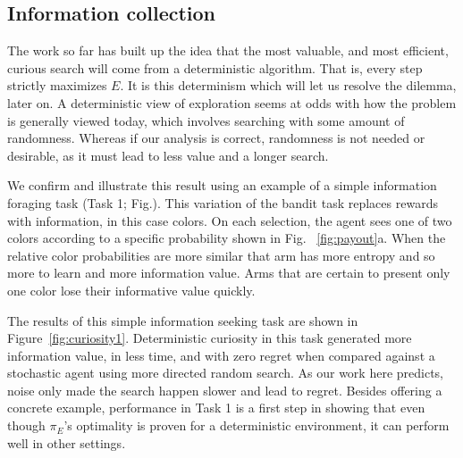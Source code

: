 \subsection{Information collection}
The work so far has built up the idea that the most valuable, and most efficient, curious search will come from a deterministic algorithm. That is, every step strictly maximizes $E$. It is this determinism which will let us resolve the dilemma, later on. A deterministic view of exploration seems at odds with how the problem is generally viewed today, which involves searching with some amount of randomness. Whereas if our analysis is correct, randomness is not needed or desirable, as it must lead to less value and a longer search. 

We confirm and illustrate this result using an example of a simple information foraging task (Task 1; Fig.\label{fig:task_outline1}). This variation of the bandit task \citep{Sutton2018} replaces rewards with information, in this case colors. On each selection, the agent sees one of two colors according to a specific probability shown in Fig. ~\ref{fig:payout}a. When the relative color probabilities are more similar that arm has more entropy and so more to learn and more information value. Arms that are certain to present only one color lose their informative value quickly.

The results of this simple information seeking task are shown in Figure~\ref{fig:curiosity1}. Deterministic curiosity in this task generated more information value, in less time, and with zero regret when compared against a stochastic agent using more directed random search. As our work here predicts, noise only made the search happen slower and lead to regret. Besides offering a concrete example, performance in Task 1 is a first step in showing that even though $\pi_E$'s optimality is proven for a deterministic environment, it can perform well in other settings.

